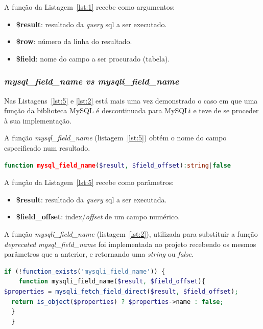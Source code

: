 A função da Listagem~\ref{lst:1} recebe como argumentos:
\begin{itemize}
  \item \textbf{\$result}: resultado da \textit{query} \acrshort{sql} a ser executado.
  \item \textbf{\$row}: número da linha do resultado.
  \item \textbf{\$field}: nome do campo a ser procurado (tabela).
\end{itemize}


\subsubsection{\textit{mysql\_field\_name vs mysqli\_field\_name}}

Nas Listagens~\ref{lst:5} e \ref{lst:2} está mais uma vez demonstrado o caso em que uma função da biblioteca MySQL é descontinuada para MySQLi e teve de se proceder à sua implementação.

A função \textit{mysql\_field\_name} (listagem~\ref{lst:5}) obtém o nome do campo especificado num resultado.


\begin{lstlisting}[language={php},
                   caption={Função mysql\_field\_name.},
                   label=lst:5]
  function mysql_field_name($result, $field_offset):string|false

\end{lstlisting}

A função da Listagem~\ref{lst:5} recebe como parâmetros:
\begin{itemize}
  \item \textbf{\$result}: resultado da \textit{query} \acrshort{sql} a ser executada.
  \item \textbf{\$field\_offset}: index/\textit{offset} de um campo numérico.
\end{itemize}


A função \textit{mysqli\_field\_name} (listagem~\ref{lst:2}), utilizada para substituir a função \textit{deprecated mysql\_field\_name} foi implementada no projeto recebendo os mesmos parâmetros que a anterior, e retornando uma \textit{string} ou \textit{false}.

\begin{lstlisting}[language={php},
                   caption={Função para substituir mysql\_field\_name.},
                   label=lst:2]
  if (!function_exists('mysqli_field_name')) {
    function mysqli_field_name($result, $field_offset){
$properties = mysqli_fetch_field_direct($result, $field_offset);
  return is_object($properties) ? $properties->name : false;
  }
  }
\end{lstlisting}


